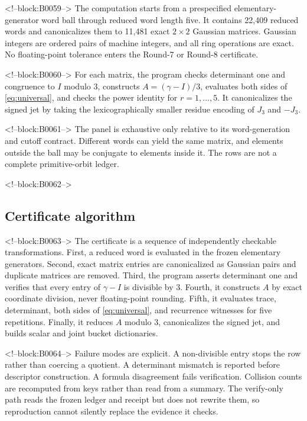 \documentclass[11pt,a4paper]{article}
\theoremstyle{definition}
\theoremstyle{remark}
\begin{document}
<!--block:B0059-->
The computation starts from a prespecified elementary-generator word ball through reduced word length five. It contains 22,409 reduced words and canonicalizes them to 11,481 exact \(2\times2\) Gaussian matrices. Gaussian integers are ordered pairs of machine integers, and all ring operations are exact. No floating-point tolerance enters the Round-7 or Round-8 certificate.

<!--block:B0060-->
For each matrix, the program checks determinant one and congruence to \(I\) modulo \(3\), constructs \(A=(\gamma-I)/3\), evaluates both sides of \cref{eq:universal}, and checks the power identity for \(r=1,\ldots,5\). It canonicalizes the signed jet by taking the lexicographically smaller residue encoding of \(J_3\) and \(-J_3\).

<!--block:B0061-->
The panel is exhaustive only relative to its word-generation and cutoff contract. Different words can yield the same matrix, and elements outside the ball may be conjugate to elements inside it. The rows are not a complete primitive-orbit ledger.

<!--block:B0062-->
\subsection{Certificate algorithm}

<!--block:B0063-->
The certificate is a sequence of independently checkable transformations. First, a reduced word is evaluated in the frozen elementary generators. Second, exact matrix entries are canonicalized as Gaussian pairs and duplicate matrices are removed. Third, the program asserts determinant one and verifies that every entry of \(\gamma-I\) is divisible by \(3\). Fourth, it constructs \(A\) by exact coordinate division, never floating-point rounding. Fifth, it evaluates trace, determinant, both sides of \cref{eq:universal}, and recurrence witnesses for five repetitions. Finally, it reduces \(A\) modulo \(3\), canonicalizes the signed jet, and builds scalar and joint bucket dictionaries.

<!--block:B0064-->
Failure modes are explicit. A non-divisible entry stops the row rather than coercing a quotient. A determinant mismatch is reported before descriptor construction. A formula disagreement fails verification. Collision counts are recomputed from keys rather than read from a summary. The verify-only path reads the frozen ledger and receipt but does not rewrite them, so reproduction cannot silently replace the evidence it checks.
\end{document}
